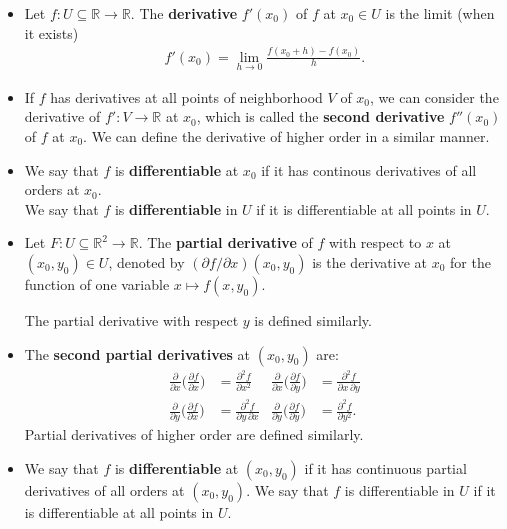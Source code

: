 \documentclass[10pt]{article}
\newcommand{\ra}{\rightarrow}
\newcommand{\Real}{\mathbb{R}}
\begin{document}
  \begin{itemize}
    \item Let $f: U \subseteq \Real \ra \Real$. The {\bf derivative} $f'(x_0)$ of $f$ at $x_0 \in U$ is the limit (when it exists)
    \begin{align*}
      f'(x_0) = \lim_{h \ra 0} \frac{f(x_0+h) - f(x_0)}{h}.
    \end{align*}

    \item If $f$ has derivatives at all points of neighborhood $V$ of $x_0$, we can consider the derivative of $f':V \ra \Real$ at $x_0$, which is called the {\bf second derivative} $f''(x_0)$ of $f$ at $x_0$. We can define the derivative of higher order in a similar manner.

    \item We say that $f$ is {\bf differentiable} at $x_0$ if it has continous derivatives of all orders at $x_0$.\\
    We say that $f$ is {\bf differentiable} in $U$ if it is differentiable at all points in $U$.

    \item Let $F: U \subseteq \Real^2 \ra \Real$. The {\bf partial derivative} of $f$ with respect to $x$ at $(x_0,y_0) \in U$, denoted by $(\partial f / \partial x)(x_0, y_0)$ is the derivative at $x_0$ for the function of one variable $x \mapsto f(x,y_0)$.

    The partial derivative with respect $y$ is defined similarly.

    \item The {\bf second partial derivatives} at $(x_0,y_0)$ are:
    \begin{align*}
      \frac{\partial}{\partial x} \bigg( \frac{\partial f }{\partial x} \bigg) &= \frac{\partial^2 f}{\partial x^2} &
      \frac{\partial}{\partial x} \bigg( \frac{\partial f }{\partial y} \bigg) &= \frac{\partial^2 f}{\partial x\, \partial y} \\
      \frac{\partial}{\partial y} \bigg( \frac{\partial f }{\partial x} \bigg) &= \frac{\partial^2 f}{\partial y\, \partial x} &
      \frac{\partial}{\partial y} \bigg( \frac{\partial f }{\partial y} \bigg) &= \frac{\partial^2 f}{\partial y^2}.
    \end{align*}    
    Partial derivatives of higher order are defined similarly.

    \item We say that $f$ is {\bf differentiable} at $(x_0,y_0)$ if it has continuous partial derivatives of all orders at $(x_0,y_0)$.
    We say that $f$ is differentiable in $U$ if it is differentiable at all points in $U$.  


\end{itemize}
\end{document}
